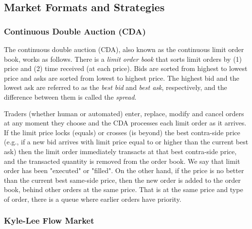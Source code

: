 \documentclass{article}
\begin{document}
\subsection{Market Formats and Strategies}

\subsubsection{Continuous Double Auction (CDA)}
The continuous double auction (CDA), also known as the continuous limit order book, works as follows. There is a \textit{limit order book} that sorts limit orders by (1) price and (2) time received (at each price). Bids are sorted from highest to lowest price and asks are sorted from lowest to highest price. The highest bid and the lowest ask are referred to as the \textit{best bid} and \textit{best ask}, respectively, and the difference between them is called the \textit{spread}.

Traders (whether human or automated) enter, replace, modify and cancel orders at any moment they choose and the CDA processes each limit order as it arrives. If the limit price locks (equals) or crosses (is beyond) the best contra-side price (e.g., if a new bid arrives with limit price equal to or higher than the current best ask) then the limit order immediately transacts at that best contra-side price, and the transacted quantity is removed from the order book. We say that limit order has been "executed" or "filled".  
On the other hand, if the price is no better than the current best same-side price, then the new order is added to the order book, behind other orders at the same price. That is at the same price and type of order, there is a queue where earlier orders have priority.


\subsubsection{Kyle-Lee Flow Market}

\end{document}
